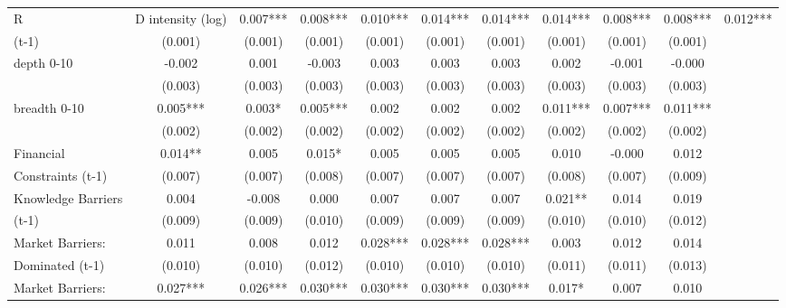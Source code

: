 \begin{table}[htbp]
\begin{tabular}{l*{9}{c}}
R&D intensity (log) &       0.007***&       0.008***&       0.010***&       0.014***&       0.014***&       0.014***&       0.008***&       0.008***&       0.012***\\
(t-1)               &     (0.001)   &     (0.001)   &     (0.001)   &     (0.001)   &     (0.001)   &     (0.001)   &     (0.001)   &     (0.001)   &     (0.001)   \\
depth 0-10          &      -0.002   &       0.001   &      -0.003   &       0.003   &       0.003   &       0.003   &       0.002   &      -0.001   &      -0.000   \\
                    &     (0.003)   &     (0.003)   &     (0.003)   &     (0.003)   &     (0.003)   &     (0.003)   &     (0.003)   &     (0.003)   &     (0.003)   \\
breadth 0-10        &       0.005***&       0.003*  &       0.005***&       0.002   &       0.002   &       0.002   &       0.011***&       0.007***&       0.011***\\
                    &     (0.002)   &     (0.002)   &     (0.002)   &     (0.002)   &     (0.002)   &     (0.002)   &     (0.002)   &     (0.002)   &     (0.002)   \\
Financial           &       0.014** &       0.005   &       0.015*  &       0.005   &       0.005   &       0.005   &       0.010   &      -0.000   &       0.012   \\
Constraints (t-1)   &     (0.007)   &     (0.007)   &     (0.008)   &     (0.007)   &     (0.007)   &     (0.007)   &     (0.008)   &     (0.007)   &     (0.009)   \\
Knowledge Barriers  &       0.004   &      -0.008   &       0.000   &       0.007   &       0.007   &       0.007   &       0.021** &       0.014   &       0.019   \\
(t-1)               &     (0.009)   &     (0.009)   &     (0.010)   &     (0.009)   &     (0.009)   &     (0.009)   &     (0.010)   &     (0.010)   &     (0.012)   \\
Market Barriers:    &       0.011   &       0.008   &       0.012   &       0.028***&       0.028***&       0.028***&       0.003   &       0.012   &       0.014   \\
Dominated (t-1)     &     (0.010)   &     (0.010)   &     (0.012)   &     (0.010)   &     (0.010)   &     (0.010)   &     (0.011)   &     (0.011)   &     (0.013)   \\
Market Barriers:    &       0.027***&       0.026***&       0.030***&       0.030***&       0.030***&       0.030***&       0.017*  &       0.007   &       0.010   \\

\end{tabular}
\end{table}
